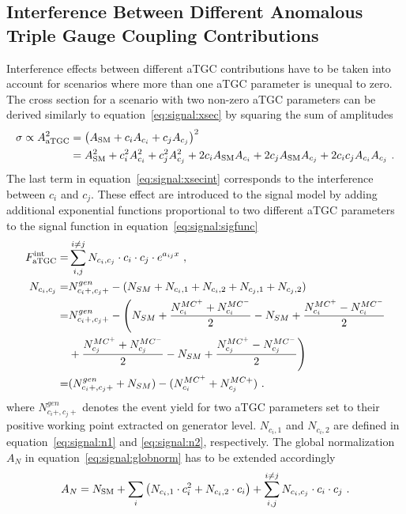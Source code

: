 \subsection{Interference Between Different Anomalous Triple Gauge Coupling Contributions}
\label{subsec:signal:aTGCInt}
Interference effects between different aTGC contributions have to be taken into account for scenarios where more than one aTGC parameter is unequal to zero. The cross section for a scenario with two non-zero aTGC parameters can be derived similarly to equation~\ref{eq:signal:xsec} by squaring the sum of amplitudes
\begin{align}
\sigma \propto A_{\rm aTGC}^2 &= \left( A_{\rm SM} + c_i A_{c_i} + c_j A_{c_j} \right)^2 \\
&= A_{\rm SM}^2 + c_i^2 A_{c_i}^2 + c_j^2 A_{c_j}^2 + 2c_i A_{\rm SM} A_{c_i} + 2c_j A_{\rm SM} A_{c_j} + 2c_ic_jA_{c_i}A_{c_j} ~. \label{eq:signal:xsecint}
\end{align}
The last term in equation~\ref{eq:signal:xsecint} corresponds to the interference between $c_i$ and $c_j$. These effect are introduced to the signal model by adding additional exponential functions proportional to two different aTGC parameters to the signal function in equation~\ref{eq:signal:sigfunc}
\begin{align}
F_{\rm aTGC}^{\rm int} =& \sum_{i,j}^{i \neq j} N_{c_i,c_j} \cdot c_i \cdot c_j \cdot e^{a_{ij}x} ~, \\
N_{c_i,c_j} =& N_{c_i+,c_j+}^{gen} - (N_{SM} + N_{c_i,1} + N_{c_i,2} + N_{c_j,1} + N_{c_j,2}) \\ 
	=& N_{c_i+,c_j+}^{gen} - \Bigg(N_{SM} + \frac{N_{c_i}^{MC^+}+N_{c_i}^{MC^-}}{2}-N_{SM} + \frac{N_{c_i}^{MC^+}-N_{c_i}^{MC^-}}{2} \\ 
	&+ \frac{N_{c_j}^{MC^+}+N_{c_j}^{MC^-}}{2}-N_{SM} + \frac{N_{c_j}^{MC^+}-N_{c_j}^{MC^-}}{2} \Bigg) \nonumber \\ 
	=&(N_{c_i+,c_j+}^{gen}+N_{SM})-(N_{c_i}^{MC^+}+N_{c_j}^{MC+}) ~. 
\end{align}
where $N_{c_i+,c_j+}^{gen}$ denotes the event yield for two aTGC parameters set to their positive working point extracted on generator level. $N_{c_i,1}$ and $N_{c_i,2}$ are defined in equation~\ref{eq:signal:n1} and \ref{eq:signal:n2}, respectively. The global normalization $A_N$ in equation~\ref{eq:signal:globnorm} has to be extended accordingly
\begin{equation}
A_N = N_{\rm SM} + \sum_i \left( N_{c_i,1}\cdot c_i^2 + N_{c_i,2}\cdot c_i \right) + \sum_{i,j}^{i \neq j} N_{c_i,c_j} \cdot c_i \cdot c_j ~. 
\end{equation}
